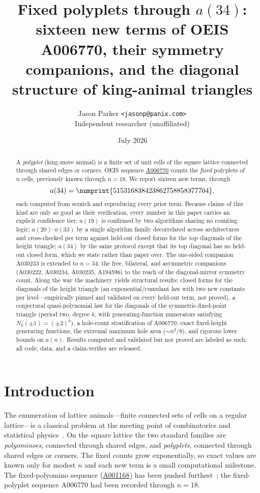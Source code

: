 \documentclass[11pt]{article}
\title{\textbf{Fixed polyplets through $a(34)$: sixteen new terms of OEIS
A006770, their symmetry companions, and the diagonal structure of king-animal
triangles}}
\author{Jason Parker \texttt{<jasonp@panix.com>}\\[2pt]
\small Independent researcher (unaffiliated)}
\date{July 2026}
\newcommand{\num}[1]{\numprint{#1}}
\begin{document}
\maketitle

\begin{abstract}
\noindent
A \emph{polyplet} (king-move animal) is a finite set of unit cells of the square
lattice connected through shared edges or corners. OEIS sequence
\href{https://oeis.org/A006770}{A006770} counts the \emph{fixed} polyplets of $n$
cells, previously known through $n=18$. We report sixteen new terms, through
\[
  a(34) = \num{515316838423862758858377704},
\]
each computed from scratch and reproducing every prior term. Because claims of
this kind are only as good as their verification, every number in this paper
carries an explicit confidence tier: $a(19)$ is confirmed by two algorithms
sharing no counting logic; $a(20)$--$a(33)$ by a single algorithm family
decorrelated across architectures and cross-checked per term against held-out
closed forms for the top diagonals of the height triangle; $a(34)$ by the same
protocol except that its top diagonal has no held-out closed form, which we
state rather than paper over. The one-sided companion A030233 is extended to
$n=34$; the free, bilateral, and asymmetric companions (A030222, A030234,
A030235, A194596) to the reach of the diagonal-mirror symmetry count. Along the
way the machinery yields structural results: closed forms for the diagonals
of the height triangle (an exponential/cumulant law with two new constants
per level---empirically pinned and validated on every held-out term, not
proved), a conjectural quasi-polynomial law for the diagonals of the
symmetric-fixed-point triangle (period two, degree $k$, with
generating-function numerators satisfying $N_k(\pm1)=(\pm2)^k$), a hole-count
stratification of A006770, exact fixed-height generating functions, the
extremal maximum hole area ($\sim n^2/8$), and rigorous lower bounds on
$a(n)$. Results computed and
validated but not proved are labeled as such; all code, data, and a
claim-verifier are released.
\end{abstract}

\section{Introduction}
\label{sec:intro}

The enumeration of lattice animals---finite connected sets of cells on a regular
lattice---is a classical problem at the meeting point of combinatorics and
statistical physics~\cite{klarner,jensen2001}. On the square lattice the two
standard families are \emph{polyominoes}, connected through shared edges, and
\emph{polyplets}, connected through shared edges or corners. The fixed counts
grow exponentially, so exact values are known only for modest $n$ and each new
term is a small computational milestone. The fixed-polyomino sequence
(\href{https://oeis.org/A001168}{A001168}) has been pushed
furthest~\cite{redelmeier,jensen2003,barequet}; the fixed-polyplet sequence
A006770 had been recorded through $n=18$.
\end{document}
